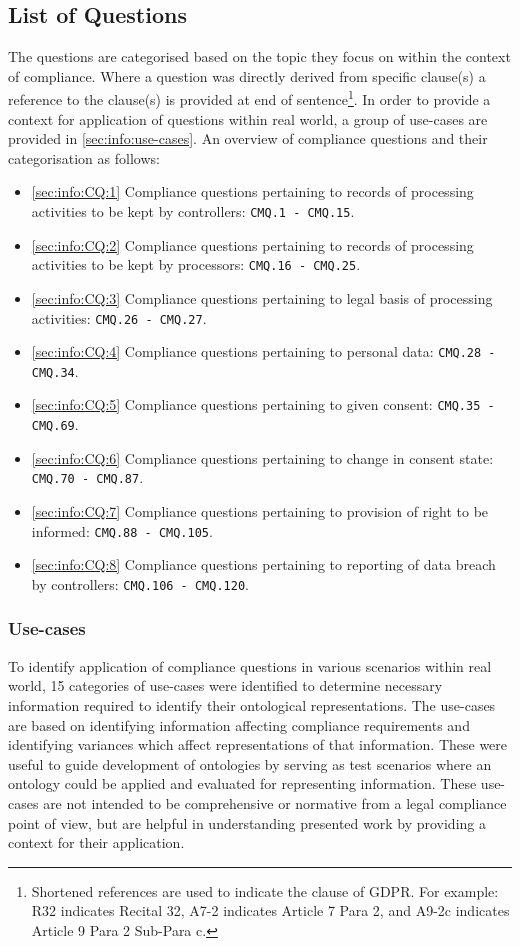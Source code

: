 \subsection{List of Questions}\label{sec:info:compliance-questions-list}
The questions are categorised based on the topic they focus on within the context of compliance. Where a question was directly derived from specific clause(s) a reference to the clause(s) is provided at end of sentence\footnote{Shortened references are used to indicate the clause of GDPR. For example: R32 indicates Recital 32, A7-2 indicates Article 7 Para 2, and A9-2c indicates Article 9 Para 2 Sub-Para c.}.
In order to provide a context for application of questions within real world, a group of use-cases are provided in \autoref{sec:info:use-cases}.
An overview of compliance questions and their categorisation as follows:
\begin{itemize}
	\item \autoref{sec:info:CQ:1} Compliance questions pertaining to records of processing activities to be kept by controllers: \texttt{CMQ.1 - CMQ.15}.
	\item \autoref{sec:info:CQ:2} Compliance questions pertaining to records of processing activities to be kept by processors: \texttt{CMQ.16 - CMQ.25}.
	\item \autoref{sec:info:CQ:3} Compliance questions pertaining to legal basis of processing activities: \texttt{CMQ.26 - CMQ.27}.
	\item \autoref{sec:info:CQ:4} Compliance questions pertaining to personal data: \texttt{CMQ.28 - CMQ.34}.
	\item \autoref{sec:info:CQ:5} Compliance questions pertaining to given consent: \texttt{CMQ.35 - CMQ.69}.
	\item \autoref{sec:info:CQ:6} Compliance questions pertaining to change in consent state: \texttt{CMQ.70 - CMQ.87}.
	\item \autoref{sec:info:CQ:7} Compliance questions pertaining to provision of right to be informed: \texttt{CMQ.88 - CMQ.105}.
	\item \autoref{sec:info:CQ:8} Compliance questions pertaining to reporting of data breach by controllers: \texttt{CMQ.106 - CMQ.120}.
\end{itemize} 

\subsubsection{Use-cases}\label{sec:info:use-cases}
To identify application of compliance questions in various scenarios within real world, 15 categories of use-cases were identified to determine necessary information required to identify their ontological representations.
The use-cases are based on identifying information affecting compliance requirements and identifying variances which affect representations of that information.
These were useful to guide development of ontologies by serving as test scenarios where an ontology could be applied and evaluated for representing information.
These use-cases are not intended to be comprehensive or normative from a legal compliance point of view, but are helpful in understanding presented work by providing a context for their application.

